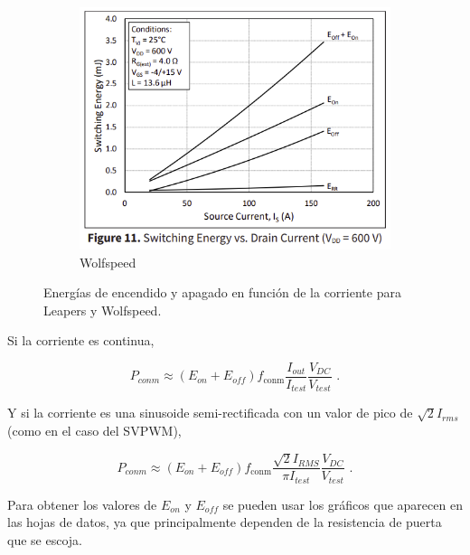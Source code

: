 \begin{figure}[H]
\begin{subfigure}[b]{0.55\linewidth}
		\includegraphics[width=\linewidth]{fig/eoneoffwolfspeed}
		\caption{Wolfspeed}
	\end{subfigure}
	\caption{Energías de encendido y apagado en función de la corriente para Leapers y Wolfspeed.}
\end{figure}

Si la corriente es continua,

\begin{equation}
P_{conm} \approx (E_{on} + E_{off}) f_{\text{conm}} \frac{I_{out}}{I_{test}} \frac{V_{DC}}{V_{test}} \text{ .}
\end{equation}

Y si la corriente es una sinusoide semi-rectificada con un valor de pico de \(\sqrt{2} I_{rms}\) (como en el caso del SVPWM), 

\begin{equation}
P_{conm} \approx (E_{on} + E_{off}) f_{\text{conm}} \frac{\sqrt{2} I_{RMS}}{\pi I_{test}} \frac{V_{DC}}{V_{test}}\text{ .}
\end{equation}

Para obtener los valores de $E_{on}$ y $E_{off}$ se pueden usar los gráficos que aparecen en las hojas de datos, ya que principalmente dependen de la resistencia de puerta que se escoja.

